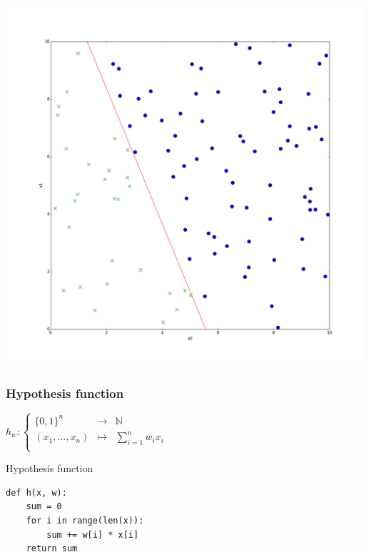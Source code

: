 \begin{frame}
  \begin{center}
    \includegraphics[scale=0.2]{./pictures/logreg_db078.png}
  \end{center}
\end{frame}

\begin{frame}
  \frametitle{Hypothesis function}
  $h_w:
  \left \{
    \begin{array}{ccc}
      \{0, 1\}^n & \to & \mathbb{N} \\
      (x_1, \ldots, x_{n}) & \mapsto &
      \displaystyle\sum_{i=1}^n{w_i x_i} \\
    \end{array}
  \right.$
\end{frame}

\begin{frame}[fragile]
  \begin{block}{Hypothesis function}
      \begin{lstlisting}
def h(x, w):
    sum = 0
    for i in range(len(x)):
        sum += w[i] * x[i]
    return sum
      \end{lstlisting}
  \end{block}
\end{frame}

